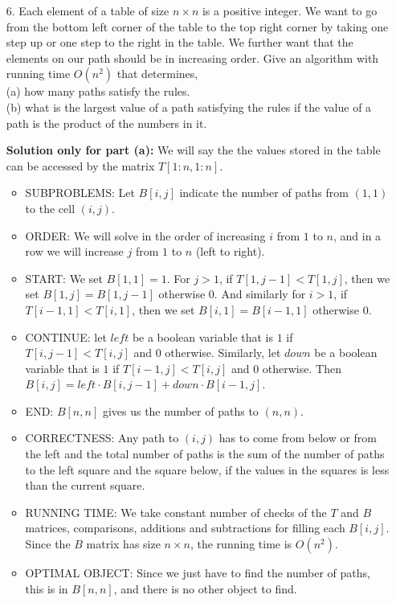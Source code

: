 \documentclass{article}
\begin{document}
\begin{enumerate}
\item[6.] Each element of a table of size $n \times n$ is a positive integer. We want to go from the bottom left corner of the table to the top right corner by taking one step up or one step to the right in the table. We further want that the elements on our path should be in increasing order. Give an algorithm with running time $O(n^2)$ that determines, \\
(a) how many paths satisfy the rules. \\
(b) what is the largest value of a path satisfying the rules if the value of a path is the product of the numbers in it.

{\bf Solution only for part (a):} We will say the the values stored in the table can be accessed by the matrix $T[1:n,1:n]$.
\begin{itemize}
\item SUBPROBLEMS: Let $B[i,j]$ indicate the number of paths from $(1,1)$ to the cell $(i,j)$.
\item ORDER: We will solve in the order of increasing $i$ from $1$ to $n$, and in a row we will increase $j$ from $1$ to $n$ (left to right).
\item START: We set $B[1,1]=1$. 
For $j>1$, if $T[1,j-1]<T[1,j]$, then we set $B[1,j]=B[1,j-1]$ otherwise $0$.  
And similarly for $i>1$, if $T[i-1,1]<T[i,1]$, then we set $B[i,1]=B[i-1,1]$ otherwise $0$.  
\item CONTINUE: let $left$ be a boolean variable that is $1$ if $T[i,j-1]<T[i,j]$ and $0$ otherwise. Similarly, let $down$ be a boolean variable that is $1$ if $T[i-1,j]<T[i,j]$ and $0$ otherwise. Then $B[i,j] = left \cdot B[i,j-1] + down \cdot B[i-1,j]$.
\item END: $B[n,n]$ gives us the number of paths to $(n,n)$.
\item CORRECTNESS: Any path to $(i,j)$ has to come from below or from the left and the total number of paths is the sum of the number of paths to the left square and the square below, if the values in the squares is less than the current square. 
\item RUNNING TIME: We take constant number of checks of the $T$ and $B$ matrices, comparisons, additions and subtractions for filling each $B[i,j]$. Since the $B$ matrix has size $n \times n$, the running time is $O(n^2)$.
\item OPTIMAL OBJECT: Since we just have to find the number of paths, this is in $B[n,n]$, and there is no other object to find.
\end{itemize}

\end{enumerate}
\end{document}
